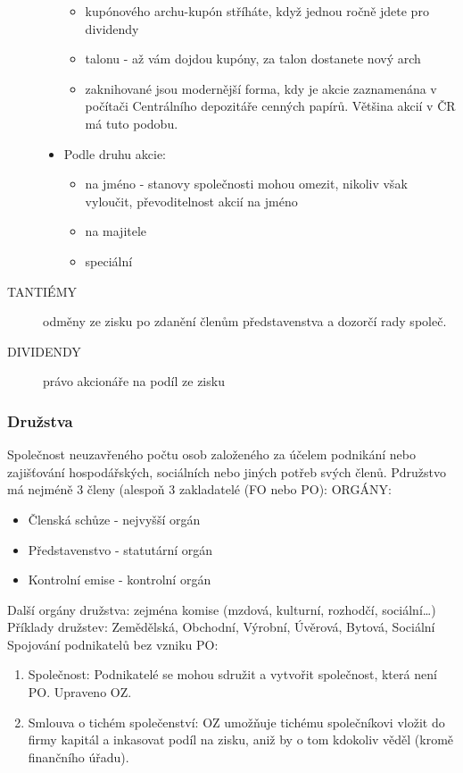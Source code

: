 \documentclass[11pt,a4paper,twoside]{book}
\begin{document}
\begin{description}
\begin{itemize}
\begin{itemize}
										\item kupónového archu-kupón stříháte, když jednou ročně jdete pro dividendy
										\item talonu - až vám dojdou kupóny, za talon dostanete nový arch
										\item zaknihované jsou modernější forma, kdy je akcie zaznamenána v počítači Centrálního depozitáře cenných papírů. Většina akcií v ČR má tuto podobu.								
									\end{itemize}
								\item Podle druhu akcie:
									\begin{itemize}
										\item na jméno - stanovy společnosti mohou omezit, nikoliv však vyloučit, převoditelnost akcií na jméno
										\item na majitele
										\item speciální
									\end{itemize}
							\end{itemize}
						\item[TANTIÉMY] odměny ze zisku po zdanění členům představenstva a dozorčí rady společ.
						\item[DIVIDENDY] právo akcionáře na podíl ze zisku
					\end{description}
				\subsubsection{Družstva}
					Společnost neuzavřeného počtu osob založeného za účelem podnikání nebo zajišťování hospodářských, sociálních nebo jiných potřeb svých členů.
					Pdružstvo má nejméně 3 členy (alespoň 3 zakladatelé (FO nebo PO):
					ORGÁNY:
					\begin{itemize}
						\item Členská schůze - nejvyšší orgán
						\item Představenstvo - statutární orgán
						\item Kontrolní emise - kontrolní orgán							
					\end{itemize}
					Další orgány družstva: zejména komise (mzdová, kulturní, rozhodčí, sociální\ldots)
					Příklady družstev: Zemědělská, Obchodní, Výrobní, Úvěrová, Bytová, Sociální
					Spojování podnikatelů bez vzniku PO:
					\begin{enumerate}
						\item Společnost: Podnikatelé se mohou sdružit a vytvořit společnost, která není PO. Upraveno OZ.
						\item Smlouva o tichém společenství: OZ umožňuje tichému společníkovi vložit do firmy kapitál a inkasovat podíl na zisku, aniž by o tom kdokoliv věděl (kromě finančního úřadu).
					\end{enumerate}
\end{document}
